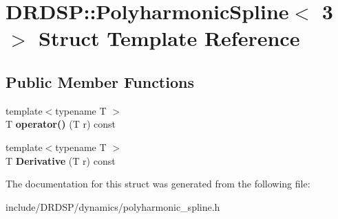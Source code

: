 \hypertarget{struct_d_r_d_s_p_1_1_polyharmonic_spline_3_013_01_4}{\section{D\-R\-D\-S\-P\-:\-:Polyharmonic\-Spline$<$ 3 $>$ Struct Template Reference}
\label{struct_d_r_d_s_p_1_1_polyharmonic_spline_3_013_01_4}
}
\subsection*{Public Member Functions}
\begin{DoxyCompactItemize}
\item 
\hypertarget{struct_d_r_d_s_p_1_1_polyharmonic_spline_3_013_01_4_ad67a9a1674be8012a4b53c45250da713}{{\footnotesize template$<$typename T $>$ }\\T {\bfseries operator()} (T r) const }\label{struct_d_r_d_s_p_1_1_polyharmonic_spline_3_013_01_4_ad67a9a1674be8012a4b53c45250da713}

\item 
\hypertarget{struct_d_r_d_s_p_1_1_polyharmonic_spline_3_013_01_4_a227b29fdc10b6938a65fbccc21cbc293}{{\footnotesize template$<$typename T $>$ }\\T {\bfseries Derivative} (T r) const }\label{struct_d_r_d_s_p_1_1_polyharmonic_spline_3_013_01_4_a227b29fdc10b6938a65fbccc21cbc293}

\end{DoxyCompactItemize}


The documentation for this struct was generated from the following file\-:\begin{DoxyCompactItemize}
\item 
include/\-D\-R\-D\-S\-P/dynamics/polyharmonic\-\_\-spline.\-h\end{DoxyCompactItemize}
